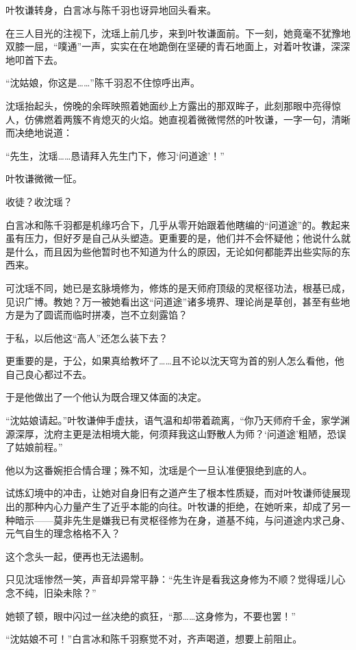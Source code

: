 \vspace{2em}

叶牧谦转身，白言冰与陈千羽也讶异地回头看来。

在三人目光的注视下，沈瑶上前几步，来到叶牧谦面前。下一刻，她竟毫不犹豫地双膝一屈，“噗通”一声，实实在在地跪倒在坚硬的青石地面上，对着叶牧谦，深深地叩首下去。

“沈姑娘，你这是……”陈千羽忍不住惊呼出声。

沈瑶抬起头，傍晚的余晖映照着她面纱上方露出的那双眸子，此刻那眼中亮得惊人，仿佛燃着两簇不肯熄灭的火焰。她直视着微微愕然的叶牧谦，一字一句，清晰而决绝地说道：

“先生，沈瑶……恳请拜入先生门下，修习‘问道途’！”

叶牧谦微微一怔。

收徒？收沈瑶？

白言冰和陈千羽都是机缘巧合下，几乎从零开始跟着他瞎编的“问道途”的。教起来虽有压力，但好歹是自己从头塑造。更重要的是，他们并不会怀疑他；他说什么就是什么，而且因为些他暂时也不知道为什么的原因，无论如何都能弄出些实际的东西来。

可沈瑶不同，她已是玄脉境修为，修炼的是天师府顶级的灵枢径功法，根基已成，见识广博。教她？万一被她看出这“问道途”诸多境界、理论尚是草创，甚至有些地方是为了圆谎而临时拼凑，岂不立刻露馅？

于私，以后他这“高人”还怎么装下去？

更重要的是，于公，如果真给教坏了……且不论以沈天穹为首的别人怎么看他，他自己良心都过不去。

于是他做出了一个他认为既合理又体面的决定。

“沈姑娘请起。”叶牧谦伸手虚扶，语气温和却带着疏离，“你乃天师府千金，家学渊源深厚，沈府主更是法相境大能，何须拜我这山野散人为师？‘问道途’粗陋，恐误了姑娘前程。”

他以为这番婉拒合情合理；殊不知，沈瑶是个一旦认准便狠绝到底的人。

试炼幻境中的冲击，让她对自身旧有之道产生了根本性质疑，而对叶牧谦师徒展现出的那种内心力量产生了近乎本能的向往。叶牧谦的拒绝，在她听来，却成了另一种暗示——莫非先生是嫌我已有灵枢径修为在身，道基不纯，与问道途内求己身、元气自生的理念格格不入？

这个念头一起，便再也无法遏制。

只见沈瑶惨然一笑，声音却异常平静：“先生许是看我这身修为不顺？觉得瑶儿心念不纯，旧染未除？”

她顿了顿，眼中闪过一丝决绝的疯狂，“那……这身修为，不要也罢！”

“沈姑娘不可！”白言冰和陈千羽察觉不对，齐声喝道，想要上前阻止。

